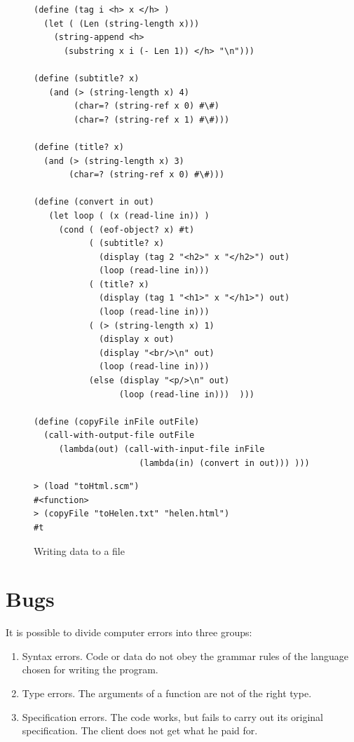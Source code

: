 \documentclass[a4paper,12pt]{book}
\newenvironment{fmpage}[1]
               {\begin{lrbox}{\fmbox}\begin{minipage}{#1}}
               {\end{minipage}\end{lrbox}\fbox{\usebox{\fmbox}}}
\begin{document}
\begin{figure}[!h]
\begin{fmpage}{\linewidth}
\begin{verbatim}
(define (tag i <h> x </h> )
  (let ( (Len (string-length x)))
    (string-append <h>
      (substring x i (- Len 1)) </h> "\n")))

(define (subtitle? x)
   (and (> (string-length x) 4)
        (char=? (string-ref x 0) #\#)
        (char=? (string-ref x 1) #\#)))

(define (title? x)
  (and (> (string-length x) 3)
       (char=? (string-ref x 0) #\#)))

(define (convert in out)
   (let loop ( (x (read-line in)) )
     (cond ( (eof-object? x) #t)
           ( (subtitle? x)
             (display (tag 2 "<h2>" x "</h2>") out)
             (loop (read-line in)))
           ( (title? x)
             (display (tag 1 "<h1>" x "</h1>") out)
             (loop (read-line in)))
           ( (> (string-length x) 1)
             (display x out)
             (display "<br/>\n" out)
             (loop (read-line in)))
           (else (display "<p/>\n" out)
                 (loop (read-line in)))  )))

(define (copyFile inFile outFile)
  (call-with-output-file outFile
     (lambda(out) (call-with-input-file inFile
                     (lambda(in) (convert in out))) )))
\end{verbatim}
\end{fmpage}

\begin{fmpage}{\linewidth}
\begin{verbatim}
> (load "toHtml.scm")
#<function>
> (copyFile "toHelen.txt" "helen.html")
#t
\end{verbatim}
\end{fmpage}
\caption{Writing data to a file}
\label{wrtFile}
\end{figure}


\chapter{Bugs}

It is possible to divide computer errors into three groups:
\begin{enumerate}
\item Syntax errors. Code or data
  do not obey the grammar rules of the language
  chosen for writing the program.
\item Type errors. The arguments of a function
  are not of the right type.
\item Specification errors. The code works,
  but fails to carry out its original specification.
  The client does not get what he paid for.
\end{enumerate}
\end{document}
